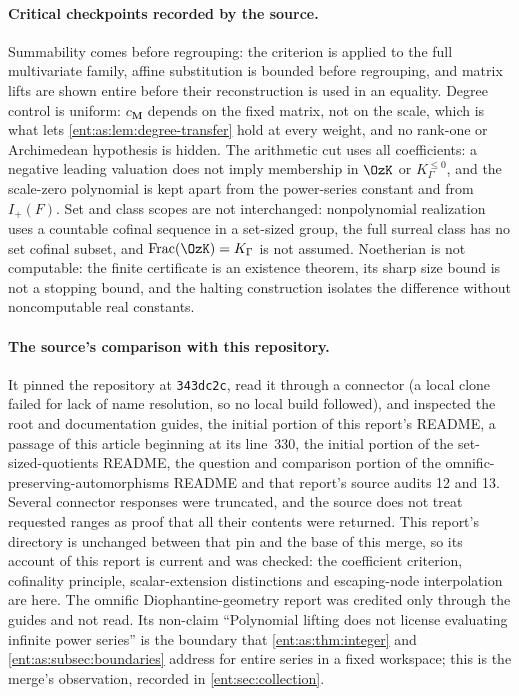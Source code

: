 \documentclass[11pt]{article}
\theoremstyle{plain}
\theoremstyle{plain}
\theoremstyle{plain}
\theoremstyle{definition}
\theoremstyle{definition}
\theoremstyle{definition}
\theoremstyle{definition}
\theoremstyle{remark}
\newcommand{\K}{K_\Gamma}\newcommand{\KD}{K_\Delta}
\newcommand{\Kle}{K_\Gamma^{\le0}}\DeclareMathOperator{\Jac}{Jac}
\begin{document}
\paragraph{Critical checkpoints recorded by the source.} Summability comes
before regrouping: the criterion is applied to the full multivariate family,
affine substitution is bounded before regrouping, and matrix lifts are shown
entire before their reconstruction is used in an equality. Degree control is
uniform: $c_{\mathbf M}$ depends on the fixed matrix, not on the scale, which is
what lets \cref{ent:as:lem:degree-transfer} hold at every weight, and no rank-one
or Archimedean hypothesis is hidden. The arithmetic cut uses all coefficients:
a negative leading valuation does not imply membership in $\OzK$ or $\Kle$, and
the scale-zero polynomial is kept apart from the power-series constant and from
$I_+(F)$. Set and class scopes are not interchanged: nonpolynomial realization
uses a countable cofinal sequence in a set-sized group, the full surreal class
has no set cofinal subset, and $\operatorname{Frac}(\OzK)=\K$ is not assumed.
Noetherian is not computable: the finite certificate is an existence theorem,
its sharp size bound is not a stopping bound, and the halting construction
isolates the difference without noncomputable real constants.

\paragraph{The source's comparison with this repository.} It pinned the
repository at \texttt{343dc2c}, read it through a connector (a local clone
failed for lack of name resolution, so no local build followed), and inspected
the root and documentation guides, the initial portion of this report's
README, a passage of this article beginning at its line~330, the initial
portion of the set-sized-quotients README, the question and comparison portion
of the omnific-preserving-automorphisms README and that report's source audits
12 and 13. Several connector responses were truncated, and the source does not
treat requested ranges as proof that all their contents were returned. This
report's directory is unchanged between that pin and the base of this merge,
so its account of this report is current and was checked: the coefficient
criterion, cofinality principle, scalar-extension distinctions and escaping-node
interpolation are here. The omnific Diophantine-geometry report was credited
only through the guides and not read. Its non-claim ``Polynomial lifting does
not license evaluating infinite power series'' is the boundary that
\cref{ent:as:thm:integer} and \cref{ent:as:subsec:boundaries} address for
entire series in a fixed workspace; this is the merge's observation, recorded
in \cref{ent:sec:collection}.
\end{document}
